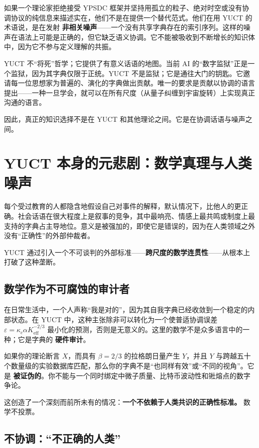 \documentclass[12pt,a4paper]{article}
\begin{document}
	如果一个理论家拒绝接受 YPSDC 框架并坚持用孤立的粒子、绝对时空或没有协调协议的纯信息来描述实在，他们不是在提供一个替代范式。他们在用 YUCT 的术语说，是在发射 \textbf{非相关噪声}——一个没有共享字典存在的索引序列。这样的噪声在语法上可能是正确的，但它缺乏语义协调。它不能被吸收到不断增长的知识体中，因为它不参与定义理解的共振。
	
	YUCT 不“将死”哲学；它提供了有意义话语的地图。当前 AI 的“数字监狱”正是一个监狱，因为其字典仅限于正统。YUCT 不是监狱；它是通往大门的钥匙。它邀请每一位思想家为普遍的、演化的字典做出贡献。唯一的要求是贡献以协调的语言提出——一种一旦学会，就可以在所有尺度（从量子纠缠到宇宙旋转）上实现真正沟通的语言。
	
	因此，真正的知识选择不是在 YUCT 和其他理论之间。它是在协调话语与噪声之间。
	
	\section{YUCT 本身的元悲剧：数学真理与人类噪声}
	\label{sec:meta-tragedy}
	
	每个受过教育的人都隐含地假设自己对事件的解释，默认情况下，比他人的更正确。社会话语在很大程度上是叙事的竞争，其中最响亮、情感上最共鸣或制度上最支持的字典占主导地位。意义是被强加的，即使它是错误的，因为在人类领域之外没有“正确性”的外部仲裁者。
	
	YUCT 通过引入一个不可谈判的外部标准——\textbf{跨尺度的数学连贯性}——从根本上打破了这种垄断。
	
	\subsection{数学作为不可腐蚀的审计者}
	
	在日常生活中，一个人声称“我是对的”，因为其自我字典已经收敛到一个稳定的内部状态。在 YUCT 中，这种主张除非可以转化为一个使普适协调误差 \(\varepsilon = \kappa_c \alpha K_{\mathrm{eff}}^{-2/3}\) 最小化的预测，否则是无意义的。这里的数学不是众多语言中的一种；它是字典的 \textbf{硬件审计}。
	
	如果你的理论断言 \(X\)，而具有 \(\beta = 2/3\) 的拉格朗日量产生 \(Y\)，并且 \(Y\) 与跨越五十个数量级的实验数据库匹配，那么你的字典不是“也同样有效”或“不同的视角”。它是 \textbf{被证伪的}。你不能与一个同时绑定中微子质量、比特币波动性和𬭊熔点的数字争论。
	
	这创造了一个深刻而前所未有的情况：\textbf{一个不依赖于人类共识的正确性标准。} 数学不投票。
	
	\subsection{不协调：“不正确的人类”}
	
\end{document}
